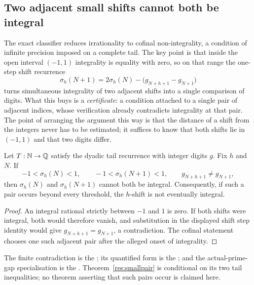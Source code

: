\documentclass[11pt]{article}
\begin{document}
\subsection{Two adjacent small shifts cannot both be integral}\label{sec:local-certificate}

The exact classifier reduces irrationality to cofinal non-integrality, a
condition of infinite precision imposed on a complete tail.  The key
point is that inside the open interval $(-1,1)$ integrality is equality with
zero, so on that range the one-step shift recurrence
\[
 \sigma_h(N+1)=2\sigma_h(N)-\bigl(g_{N+h+1}-g_{N+1}\bigr)
\]
turns simultaneous integrality of two adjacent shifts into a single comparison
of digits.  What this buys is a \emph{certificate}: a condition attached to a
single pair of adjacent indices, whose verification already contradicts
integrality at that pair.  The point of arranging the argument this
way is that the distance of a shift from the integers never has to be
estimated; it suffices to know that both shifts lie in $(-1,1)$ and that two
digits differ.

\begin{theorem}\label{res:smallpair}
Let $T:\mathbb{N}\to\mathbb{Q}$ satisfy the dyadic tail recurrence with integer digits $g$.
Fix $h$ and $N$.  If
\[
 -1<\sigma_h(N)<1,\qquad -1<\sigma_h(N+1)<1,
 \qquad g_{N+h+1}\ne g_{N+1},
\]
then $\sigma_h(N)$ and $\sigma_h(N+1)$ cannot both be integral.
Consequently, if such a pair occurs beyond every threshold, the $h$-shift is
not eventually integral.
\end{theorem}

\begin{proof}
An integral rational strictly between $-1$ and $1$ is zero.  If both shifts
were integral, both would therefore vanish, and substitution in the displayed
shift step identity would give $g_{N+h+1}=g_{N+1}$, a contradiction.  The
cofinal statement chooses one such adjacent pair after the alleged onset of
integrality.
\end{proof}

\noindent The finite contradiction is the
; its quantified form is the
; and the actual-prime-gap specialisation is the
.  Theorem~\ref{res:smallpair} is conditional on its two tail
inequalities; no theorem asserting that such pairs occur is claimed here.
\end{document}
